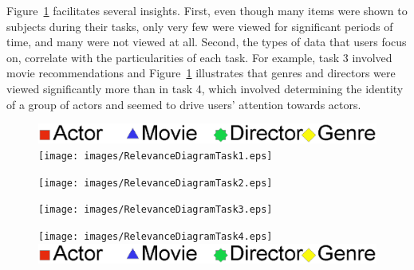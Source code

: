Figure~\ref{fig:RelevanceDiagram} facilitates several insights. First, even though many items were shown to subjects during their tasks, only very few were viewed for significant periods of time, and many were not viewed at all. Second, the types of data that users focus on, correlate with the particularities of each task. For example, task 3 involved movie recommendations and Figure~\ref{fig:RelevanceDiagram} illustrates that genres and directors were viewed significantly more than in task 4, which involved determining the identity of a group of actors and seemed to drive users' attention towards actors. 

\begin{figure}[!htb]
  \centering
	\includegraphics[width=0.45\linewidth]{images/Legends.eps}
  \texttt{[image: images/RelevanceDiagramTask1.eps]}
	
	\texttt{[image: images/RelevanceDiagramTask2.eps]}
	
	\texttt{[image: images/RelevanceDiagramTask3.eps]}
	
	\texttt{[image: images/RelevanceDiagramTask4.eps]}
	\includegraphics[width=0.45\linewidth]{images/Legends.eps}
	
	\label{fig:RelevanceDiagram}
\end{figure}



